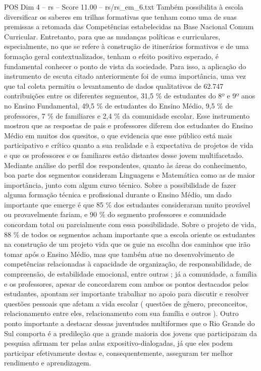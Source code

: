\begin{textsample}{POS Dim 4 – rs – Score 11.00 – rs/rs\_em\_6.txt}
Também possibilita à escola diversificar os saberes em trilhas formativas que tenham como uma de suas premissas a retomada das Competências estabelecidas na Base Nacional Comum Curricular.
Entretanto, para que as mudanças políticas e curriculares, especialmente, no que se refere à construção de itinerários formativos e de uma formação geral contextualizados, tenham o efeito positivo esperado, é fundamental conhecer o ponto de vista da sociedade.
Para isso, a aplicação do instrumento de escuta citado anteriormente foi de suma importância, uma vez que tal coleta permitiu o levantamento de dados qualitativos de 62.747 contribuições entre os diferentes segmentos, 31,5 \% de estudantes do 8º e 9º anos no Ensino Fundamental, 49,5 \% de estudantes do Ensino Médio, 9,5 \% de professores, 7 \% de familiares e 2,4 \% da comunidade escolar.
Esse instrumento mostrou que as respostas de pais e professores diferem dos estudantes do Ensino Médio em muitos dos quesitos, o que evidencia que esse público está mais participativo e crítico quanto a sua realidade e à expectativa de projetos de vida e que os professores e os familiares estão distantes desse jovem multifacetado.
Mediante análise do perfil dos respondentes, quanto às áreas do conhecimento, boa parte dos segmentos consideram Linguagens e Matemática como as de maior importância, junto com algum curso técnico.
Sobre a possibilidade de fazer alguma formação técnica e profissional durante o Ensino Médio, um dado importante que emerge é que 85 \% dos estudantes consideraram muito provável ou provavelmente fariam, e 90 \% do segmento professores e comunidade concordam total ou parcialmente com essa possibilidade.
Sobre o projeto de vida, 88 \% de todos os segmentos acham importante que a escola oriente os estudantes na construção de um projeto vida que os guie na escolha dos caminhos que irão tomar após o Ensino Médio, mas que também atue no desenvolvimento de competências relacionadas à capacidade de organização, de responsabilidade, de compreensão, de estabilidade emocional, entre outras ; já a comunidade, a família e os professores, apesar de concordarem com ambos os pontos destacados pelos estudantes, apontam ser importante trabalhar no apoio para discutir e resolver questões pessoais que afetam a vida escolar ( questões de gênero, preconceitos, relacionamento entre eles, relacionamento com sua família e outros ).
Outro ponto importante a destacar dessas juventudes multiformes que o Rio Grande do Sul comporta é a predileção que a grande maioria dos jovens que participaram da pesquisa afirmam ter pelas aulas expositivo-dialogadas, já que eles podem participar efetivamente destas e, consequentemente, asseguram ter melhor rendimento e aprendizagem.

\end{textsample}
